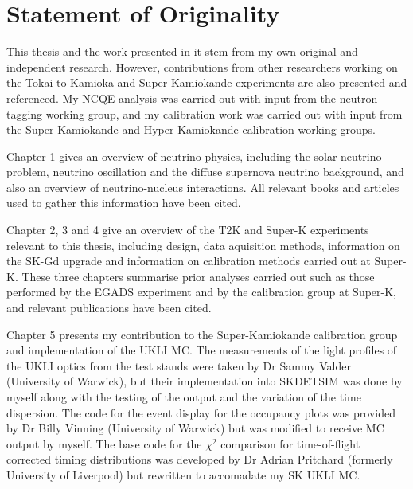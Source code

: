 \chapter*{Statement of Originality}
\thispagestyle{empty}

This thesis and the work presented in it stem from my own original and independent research. However, contributions from other researchers working on the Tokai-to-Kamioka and Super-Kamiokande experiments are also presented and referenced. My NCQE analysis was carried out with input from the neutron tagging working group, and my calibration work was carried out with input from the Super-Kamiokande and Hyper-Kamiokande calibration working groups.

Chapter 1 gives an overview of neutrino physics, including the solar neutrino problem, neutrino oscillation and the diffuse supernova neutrino background, and also an overview of neutrino-nucleus interactions. All relevant books and articles used to gather this information have been cited.

Chapter 2, 3 and 4 give an overview of the T2K and Super-K experiments relevant to this thesis, including design, data aquisition methods, information on the SK-Gd upgrade and information on calibration methods carried out at Super-K. These three chapters summarise prior analyses carried out such as those performed by the EGADS experiment and by the calibration group at Super-K, and relevant publications have been cited. 

Chapter 5 presents my contribution to the Super-Kamiokande calibration group and implementation of the UKLI MC. The measurements of the light profiles of the UKLI optics from the test stands were taken by Dr Sammy Valder (University of Warwick), but their implementation into SKDETSIM was done by myself along with the testing of the output and the variation of the time dispersion. The code for the event display for the occupancy plots was provided by Dr Billy Vinning (University of Warwick) but was modified to receive MC output by myself. The base code for the $\chi^{2}$ comparison for time-of-flight corrected timing distributions was developed by Dr Adrian Pritchard (formerly University of Liverpool) but rewritten to accomadate my SK UKLI MC. 

